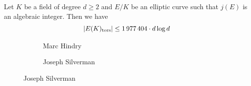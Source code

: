 \begin{frame}[plain]
\begin{thm}
Let $K$ be a field of degree $d \geq 2$ and $E/K$ be an elliptic curve such that $j(E)$ is an algebraic integer. Then we have
	\[
	|E(K)_{\text{tors}}| \leq 1\,977\,404 \cdot d \log d
	\]
\end{thm}
	\begin{figure}[h]
	\centering
	\begin{subfigure}{0.3\textwidth}
	\captionsetup{labelformat=empty}
	\centering
	\caption{Marc Hindry}
	\end{subfigure}
	\begin{subfigure}{0.3\textwidth}
	\captionsetup{labelformat=empty}
	\centering
	\caption{Joseph Silverman}
	\end{subfigure}
	\end{figure}
\end{frame}


